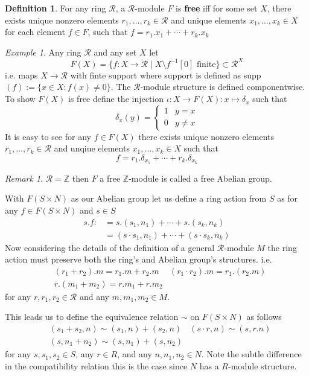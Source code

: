 \documentclass{article}
\theoremstyle{plain}
\theoremstyle{definition}
\newtheorem{defn}{Definition}[section]
\theoremstyle{remark}
\newtheorem{remark}{Remark}[section]
\newtheorem{eg}{Example}[section]
\begin{document}
  \begin{defn}
     For any ring $\mathcal{R}$, a $\mathcal{R}$-module $F$ is \textbf{free} iff
     for some set $X$, there exists unique nonzero elements 
     $r_1,\ldots,r_k\in\mathcal{R}$ and unique elements $x_1,\ldots,x_k\in X$
     for each element $f\in F$, such that $f=r_1.x_1+\cdots+r_k.x_k$
  \end{defn}
  \begin{eg}
    Any ring $\mathcal{R}$ and any set $X$ let 
    \[F(X)=\{f:X\to \mathcal{R}\;|\;X\setminus f^{-1}[0] \text{ finite}\}\subset \mathcal{R}^X\]
    i.e. maps $X\to \mathcal{R}$ with finte support where support is defined as supp$(f):=\{x\in X:f(x)\neq 0\}$.
    The $\mathcal{R}$-module structure is defined componentwise.
\\[1em]
    To show $F(X)$ is free
    define the injection $\iota:X\to F(X):x\mapsto \delta_x$ such that
    \[\delta_x(y)=\left\{\begin{array}{lr}1&y=x\\0&y\neq x\end{array}\right.\]
    It is easy to see
    for any $f\in F(X)$ there exists unique nonzero elements $r_1,\ldots,r_k\in\mathcal{R}$
    and unqiue elements $x_1,\ldots,x_k\in X$ such that \[f=r_1.\delta_{x_1}+\cdots+r_k.\delta_{x_k}\]
  \end{eg}
  \begin{remark}
    $\mathcal{R}=\mathbb{Z}$ then $F$ a free $\mathbb{Z}$-module is called a
    free Abelian group.
   \\ 
  \end{remark}

  With $F(S\times N)$ as our Abelian group let us define a ring action from $S$
  as for any $f\in F(S\times N)$ and $s\in S$
  \begin{align*}
    s.f:&=s.(s_1,n_1)+\cdots+s.(s_k,n_k) \\
    &=(s\cdot s_1,n_1)+\cdots+(s\cdot s_k,n_k)
  \end{align*}
  Now considering the details of the definition of a general $\mathcal{R}$-module $M$ the
  ring action must preserve both the ring's and Abelian group's structures. i.e.
  \begin{align*}
    &(r_1+r_2).m = r_1.m + r_2.m 
    &(r_1\cdot r_2).m = r_1.(r_2.m)\\
    &r.(m_1+m_2)=r.m_1 + r.m_2
  \end{align*}
  for any $r,r_1,r_2\in\mathcal{R}$ and any $m,m_1,m_2\in M$.

  This leads us to define the equivalence relation $\sim$ on $F(S\times N)$ as follows
  \begin{align*}
    &(s_1+s_2,n)\sim(s_1,n) + (s_2,n)
    &(s\cdot r,n)\sim(s,r.n) \\
    &(s,n_1+n_2)\sim(s,n_1)+(s,n_2)
  \end{align*}
  for any $s,s_1,s_2\in S$, any $r\in R$, and any $n,n_1,n_2\in N$.
  Note the subtle difference in the compatibility relation this is the case
  since $N$ has a $R$-module structure.
\end{document}
